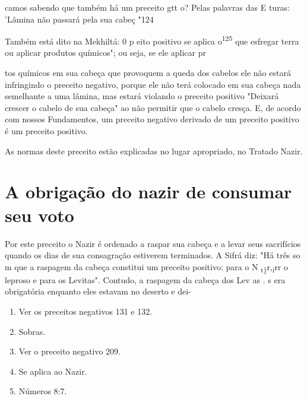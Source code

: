 \begin{itemize}
\begin{enumrate}
\begin{itemize}
\begin{itemize}
camos sabendo que também há um preceito gtt o? Pelas palavras das E
turas: 'Lâmina não passará pela sua cabeç "124

Também está dito na Mekhiltá: 0 p eito positivo se aplica
o\textsuperscript{125} que esfregar terra ou aplicar produtos químicos";
ou seja, se ele aplicar pr

tos químicos em sua cabeça que provoquem a queda dos cabelos ele não
estará infringindo o preceito negativo, porque ele não terá colocado em
sua cabeça nada semelhante a uma lâmina, mas estará violando o preceito
positivo "Dei­xará crescer o cabelo de sua cabeça" ao não permitir que o
cabelo cresça. E, de acordo com nossos Fundamentos, um preceito negativo
derivado de um pre­ceito positivo é um preceito positivo.

As normas deste preceito estão explicadas no lugar apropriado, no
Tratado Nazir.


\section{A obrigação do nazir de consumar seu voto}


Por este preceito o Nazir é ordenado a raspar sua cabeça e a levar seus
sacrifícios quando os dias de sua consagração estiverem terminados. A
Si­frá diz: "Há três so m que a raspagem da cabeça constitui um preceito
posi­tivo: para o N \textsubscript{t\}}r,\textsubscript{i}rr o leproso e
para os Levitas". Contudo, a raspagem da cabeça dos Lev as
. s era obrigatória enquanto eles estavam no deserto e
dei-


\begin{enumerate}
\def\labelenumi{\arabic{enumi}.}
\setcounter{enumi}{121}
\item
 
 Ver os preceitos negativos 131 e 132.
 
\item
 
 Sobras.
 
\item
 
 Ver o preceito negativo 209.
 
\item
 
 Se aplica ao Nazir.
 
\item
 
 Números 8:7.
 
\end{enumerate}


\end{itemize}
\end{itemize}
\end{enumrate}
\end{itemize}
